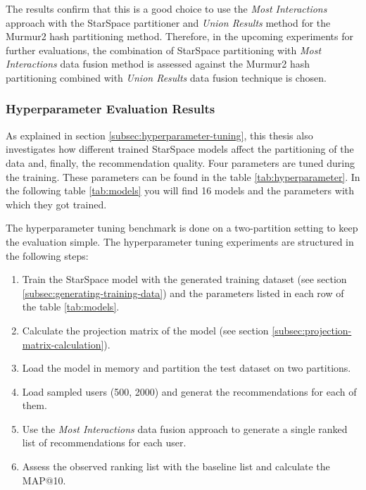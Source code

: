 The results confirm that this is a good choice to use the \emph{Most Interactions} approach with the StarSpace partitioner and \emph{Union Results} method for the Murmur2 hash partitioning method. Therefore, in the upcoming experiments for further evaluations, the combination of StarSpace partitioning with \emph{Most Interactions} data fusion method is assessed against the Murmur2 hash partitioning combined with \emph{Union Results} data fusion technique is chosen.


\subsubsection{Hyperparameter Evaluation Results}
\label{subsubsec:eval-hyperparameter}
As explained in section \ref{subsec:hyperparameter-tuning}, this thesis also investigates how different trained StarSpace models affect the partitioning of the data and, finally, the recommendation quality. Four parameters are tuned during the training. These parameters can be found in the table \ref{tab:hyperparameter}. In the following table \ref{tab:models} you will find 16 models and the parameters with which they got trained.


The hyperparameter tuning benchmark is done on a two-partition setting to keep the evaluation simple. The hyperparameter tuning experiments are structured in the following steps:

\begin{enumerate}
    \item Train the StarSpace model with the generated training dataset (see section \ref{subsec:generating-training-data}) and the parameters listed in each row of the table \ref{tab:models}.
    \item Calculate the projection matrix of the model (see section \ref{subsec:projection-matrix-calculation}).
    \item Load the model in memory and partition the test dataset on two partitions.
    \item Load sampled users (500, 2000) and generat the recommendations for each of them.
    \item Use the \emph{Most Interactions} data fusion approach to generate a single ranked list of recommendations for each user.
    \item Assess the observed ranking list with the baseline list and calculate the MAP@10.
\end{enumerate}


